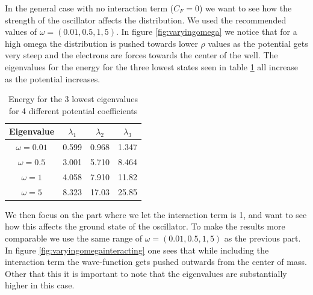 \documentclass[a4paper,11pt]{article}
\begin{document}
{%
In the general case with no interaction term ($C_F = 0$) we want to see how the strength of the oscillator affects the distribution. We used the recommended values of $\omega = (0.01, 0.5, 1, 5)$. In figure \ref{fig:varyingomega} we notice that for a high omega the distribution is pushed towards lower $\rho$ values as the potential gets very steep and the electrons are forces towards the center of the well. The eigenvalues for the energy for the three lowest states seen in table \ref{tab:varying_omega} all increase as the potential increases.

\begin{table}
	\caption{Energy for the 3 lowest eigenvalues for 4 different potential coefficients}
	\begin{center}
		\begin{tabular}{|c||c|c|c|}
			\hline
			Eigenvalue & $\lambda_1$ & $\lambda_2$ & $\lambda_3$ \\
			\hline
			\hline
			$\omega=0.01$ & 0.599 & 0.968 & 1.347  \\
			\hline
			$\omega=0.5$ & 3.001 & 5.710 & 8.464 \\
			\hline
			$\omega=1$ & 4.058 & 7.910 & 11.82 \\
			\hline
			$\omega=5$ & 8.323 & 17.03 & 25.85 \\
			\hline
		\end{tabular}
	\end{center}
	\label{tab:varying_omega}
\end{table}%


We then focus on the part where we let the interaction term is 1, and want to see how this affects the ground state of the oscillator. To make the results more comparable we use the same range of $\omega = (0.01, 0.5, 1, 5)$ as the previous part. In figure \ref{fig:varyingomegainteracting} one sees that while including the interaction term the wave-function gets pushed outwards from the center of mass. Other that this it is important to note that the eigenvalues are substantially higher in this case. 


}
\end{document}
